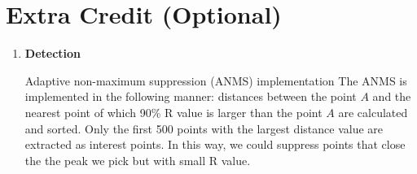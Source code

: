 
\section*{Extra Credit (Optional)}
\begin{enumerate}
    \item \textbf{Detection}
    
    Adaptive non-maximum suppression (ANMS) implementation
    The ANMS is implemented in the following manner: distances between the point $A$ and the nearest point of which 90\% R value is larger than the point $A$ are calculated and sorted. Only the first 500 points with the largest distance value are extracted as interest points. In this way, we could suppress points that close the the peak we pick but with small R value.


\end{enumerate}
